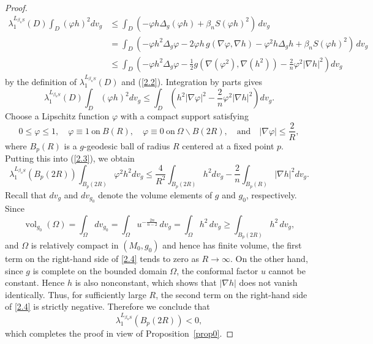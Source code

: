 \documentclass[amssymb,amstex,amsmath,11pt]{article}
\numberwithin{equation}{section}
\theoremstyle{plain}
\theoremstyle{definition}
\theoremstyle{remark}
\newcommand{\lap}{\Delta}
\newcommand{\Om}{\Omega}
\begin{document}
\begin{proof}
      \begin{align*}
        \lambda_1^{L_{\beta_nS}}(D)\int_{D} (\varphi h)^2 dv_g
        & \leq\int_{D} (-\varphi h \lap_g(\varphi h)+\beta_n S (\varphi h)^2)\, dv_g\\
        & = \int_{D} (-\varphi h^2 \lap_g \varphi -2\varphi h \,g(\nabla \varphi, \nabla h) -\varphi^2 h \lap_g h +\beta_n S (\varphi h)^2)\, dv_g \\
        & \leq \int_{D} \left(-\varphi h^2 \lap_g \varphi -\frac{1}{2} g\left(\nabla (\varphi^2), \nabla (h^2)\right) - \frac{2}{n}\varphi^2|\nabla h|^2\right) dv_g
    \end{align*}
    by the definition of $\lambda_1^{L_{\beta_n S}}(D)$ and (\ref{2.2}).
    Integration by parts gives
    \begin{equation}\label{2.3}
        \lambda_1^{L_{\beta_nS}}(D)\int_{D} (\varphi h)^2 dv_g \leq \int_{D} \left( h^2|\nabla \varphi|^2 -\frac{2}{n}\varphi^2|\nabla h|^2\right) dv_g.
    \end{equation}
    Choose a Lipschitz function $\varphi$ with a compact support satisfying
    $$0\leq \varphi\leq 1,\quad \varphi\equiv 1~ \text{on}~ B(R),\quad \varphi\equiv 0~\text{on}~\Om \backslash B(2R), \quad \text{and} \quad|\nabla \varphi|\leq \frac{2}{R},$$
    where $B_p(R)$ is a $g$-geodesic ball  of radius $R$ centered at a fixed point $p$.
    Putting this into (\ref{2.3}), we obtain
      \begin{equation}\label{2.4}
        \lambda_1^{L_{\beta_nS}}(B_p(2R))\int_{B_p(2R)} \varphi^2 h^2 dv_g \leq \frac{4}{R^2}\int_{B_p(2R)} h^2 dv_g -\frac{2}{n} \int_{B_p(R)}|\nabla h|^2dv_g.
    \end{equation}
Recall that $dv_g$ and $dv_{g_0}$ denote the volume elements of $g$ and $g_0$, respectively. Since
$$
\operatorname{vol}_{g_0}(\Omega)
=
\int_\Omega dv_{g_0}
=
\int_\Omega u^{-\frac{2n}{n-2}}\,dv_g
=
\int_\Omega h^2\,dv_g
\ge
\int_{B_p(2R)} h^2\,dv_g,
$$
and $\Omega$ is relatively compact in $(M_0,g_0)$ and hence has finite volume, the first term on the right-hand side of \eqref{2.4} tends to zero as $R\to\infty$. On the other hand, since $g$ is complete on the bounded domain $\Omega$, the conformal factor $u$ cannot be constant. Hence $h$ is also nonconstant, which shows that $|\nabla h|$ does not vanish identically. Thus, for sufficiently large $R$, the second term on the right-hand side of \eqref{2.4} is strictly negative. Therefore we conclude that
$$
\lambda_1^{L_{\beta_n S}}(B_p(2R))<0,
$$
which completes the proof in view of Proposition~\ref{prop0}.
\end{proof}
\end{document}
